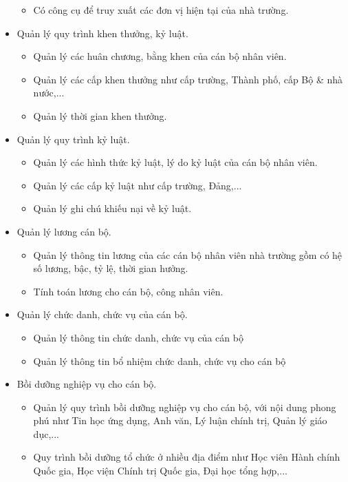 \begin{itemize}
\begin{itemize}
        \item Có công cụ để truy xuất các đơn vị hiện tại của nhà trường.
    \end{itemize}
    \item Quản lý quy trình khen thưởng, kỷ luật.
    \begin{itemize}
        \item Quản lý các huân chương, bằng khen của cán bộ nhân viên.
        \item Quản lý các cấp khen thưởng như cấp trường, Thành phố, cấp Bộ \& nhà nước,...
        \item Quản lý thời gian khen thưởng.
    \end{itemize}
    \item Quản lý quy trình kỷ luật.
    \begin{itemize}
        \item Quản lý các hình thức kỷ luật, lý do kỷ luật của cán bộ nhân viên.
        \item Quản lý các cấp kỷ luật như cấp trường, Đảng,...
        \item Quản lý ghi chú khiếu nại về kỷ luật.
    \end{itemize}
    \item Quản lý lương cán bộ.
    \begin{itemize}
        \item Quản lý thông tin lương của các cán bộ nhân viên nhà trường gồm có hệ số lương, bậc, tỷ lệ, thời gian hưởng.
        \item Tính toán lương cho cán bộ, công nhân viên.
    \end{itemize}
    \item Quản lý chức danh, chức vụ của cán bộ.
    \begin{itemize}
        \item Quản lý thông tin chức danh, chức vụ của cán bộ
        \item Quản lý thông tin bổ nhiệm chức danh, chức vụ cho cán bộ
    \end{itemize}
    \item Bồi dưỡng nghiệp vụ cho cán bộ.
    \begin{itemize}
        \item Quản lý quy trình bồi dưỡng nghiệp vụ cho cán bộ, với nội dung phong phú như Tin học ứng dụng, Anh văn, Lý luận chính trị, Quản lý giáo dục,...
        \item Quy trình bồi dưỡng tổ chức ở nhiều địa điểm như Học viên Hành chính Quốc gia, Học viện Chính trị Quốc gia, Đại học tổng hợp,...

\end{itemize}
\end{itemize}
